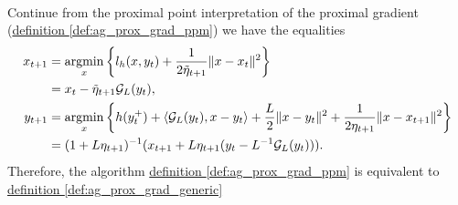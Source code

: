 \documentclass[12pt]{article}
\begin{document}
            \begin{proposition}
            \label{prop:derive_ag_prox_grad_tript}
                \quad \\
                Continue from the proximal point interpretation of the proximal gradient 
                (\hyperref[def:ag_prox_grad_ppm]{definition \ref*{def:ag_prox_grad_ppm}})
                we have the equalities 
                \begin{align*}
                    x_{t + 1} &= \mathop{\rm argmin}\limits_{x}
                    \left\lbrace
                        l_h(x, y_t) + \frac{1}{2\tilde \eta_{t + 1}} \Vert x - x_t\Vert^2
                    \right\rbrace
                    \\
                    &= x_t - \tilde\eta_{t + 1} \mathcal G_L(y_t), 
                    \\
                    y_{t + 1} &= \mathop{\rm argmin}\limits_{x}
                    \left\lbrace
                          h(y_t^+) + \langle \mathcal G_L(y_t), x - y_t\rangle + \frac{L}{2}\Vert x -y_t\Vert^2 + \frac{1}{2\eta_{t + 1}}\Vert x - x_{t + 1}\Vert^2
                    \right\rbrace
                    \\
                    &= (1 + L\eta_{t + 1})^{-1}
                    (x_{t + 1} + L\eta_{t + 1}(y_t - L^{-1}\mathcal  G_L(y_t))). 
                \end{align*}
                Therefore, the algorithm 
                \hyperref[def:ag_prox_grad_ppm]{definition \ref*{def:ag_prox_grad_ppm}}
                is equivalent to 
                \hyperref[def:ag_prox_grad_generic]{definition \ref*{def:ag_prox_grad_generic}}
            \end{proposition}
\end{document}
